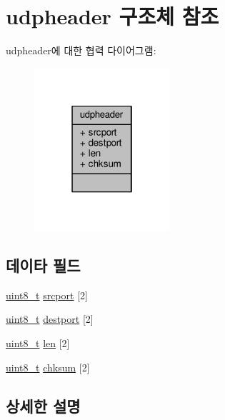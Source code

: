 \hypertarget{structavdecc__lib_1_1udpheader}{}\section{udpheader 구조체 참조}
\label{structavdecc__lib_1_1udpheader}


udpheader에 대한 협력 다이어그램\+:
\nopagebreak
\begin{figure}[H]
\begin{center}
\leavevmode
\includegraphics[width=142pt]{structavdecc__lib_1_1udpheader__coll__graph}
\end{center}
\end{figure}
\subsection*{데이타 필드}
\begin{DoxyCompactItemize}
\item 
\hyperlink{stdint_8h_aba7bc1797add20fe3efdf37ced1182c5}{uint8\+\_\+t} \hyperlink{structavdecc__lib_1_1udpheader_a16c2e21bb8af61debc522ff7128278d7}{srcport} \mbox{[}2\mbox{]}
\item 
\hyperlink{stdint_8h_aba7bc1797add20fe3efdf37ced1182c5}{uint8\+\_\+t} \hyperlink{structavdecc__lib_1_1udpheader_a50ec35685a2a3b99a37a1fa279844056}{destport} \mbox{[}2\mbox{]}
\item 
\hyperlink{stdint_8h_aba7bc1797add20fe3efdf37ced1182c5}{uint8\+\_\+t} \hyperlink{structavdecc__lib_1_1udpheader_a1f4db4ef2eda0f20fc4dd5cbff93c7be}{len} \mbox{[}2\mbox{]}
\item 
\hyperlink{stdint_8h_aba7bc1797add20fe3efdf37ced1182c5}{uint8\+\_\+t} \hyperlink{structavdecc__lib_1_1udpheader_a607d4d558dca8536ef0828423bdf9e4c}{chksum} \mbox{[}2\mbox{]}
\end{DoxyCompactItemize}


\subsection{상세한 설명}


